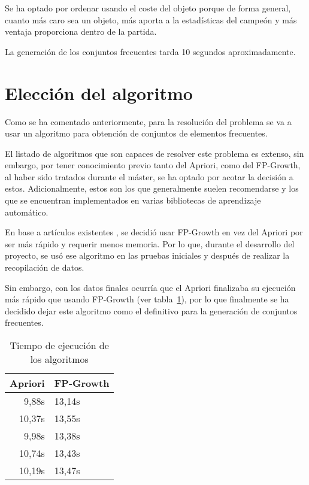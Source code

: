 Se ha optado por ordenar usando el coste del objeto porque de forma general, cuanto más caro sea un objeto, más aporta a la estadísticas del campeón y más ventaja proporciona dentro de la partida.

La generación de los conjuntos frecuentes tarda 10 segundos aproximadamente.

\section{Elección del algoritmo}
Como se ha comentado anteriormente, para la resolución del problema se va a usar un algoritmo para obtención de conjuntos de elementos frecuentes.

El listado de algoritmos \cite{chee_jaafar_aziz_hasan_yeoh_2018} que son capaces de resolver este problema es extenso, sin embargo, por tener conocimiento previo tanto del Apriori, como del FP-Growth, al haber sido tratados durante el máster, se ha optado por acotar la decisión a estos. Adicionalmente, estos son los que generalmente suelen recomendarse y los que se encuentran implementados en varias bibliotecas de aprendizaje automático.

En base a artículos existentes \cite{chonyy_2020_apriori, chonyy_2020_fpgrowth}, se decidió usar FP-Growth en vez del Apriori por ser más rápido y requerir menos memoria. Por lo que, durante el desarrollo del proyecto, se usó ese algoritmo en las pruebas iniciales y después de realizar la recopilación de datos.

Sin embargo, con los datos finales ocurría que el Apriori finalizaba su ejecución más rápido que usando FP-Growth (ver tabla~\ref{tab:tiempo-algos}), por lo que finalmente se ha decidido dejar este algoritmo como el definitivo para la generación de conjuntos frecuentes.

\begin{table}[h]
	\centering
	\begin{tabular}{rl}\toprule
		\textbf{Apriori} & \textbf{FP-Growth} \\
		\midrule
		9,88s   & 13,14s    \\
		10,37s  & 13,55s    \\
		9,98s   & 13,38s    \\
		10,74s  & 13,43s    \\
		10,19s  & 13,47s    \\ \bottomrule
	\end{tabular}
	\caption{Tiempo de ejecución de los algoritmos}
	\label{tab:tiempo-algos}
\end{table}